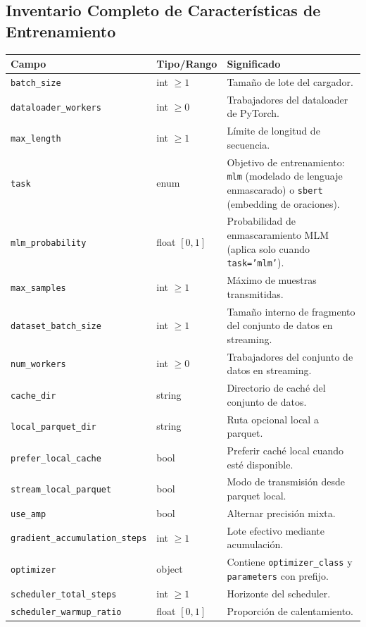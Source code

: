 \documentclass[11pt,a4paper]{article}
\begin{document}
\subsection{Inventario Completo de Características de Entrenamiento}

\small
\begin{longtable}{p{5.1cm}p{2.4cm}p{7.0cm}}
\toprule
\textbf{Campo} & \textbf{Tipo/Rango} & \textbf{Significado} \\
\midrule
\endhead
\texttt{batch\_size} & int $\ge 1$ & Tamaño de lote del cargador. \\
\texttt{dataloader\_workers} & int $\ge 0$ & Trabajadores del dataloader de PyTorch. \\
\texttt{max\_length} & int $\ge 1$ & Límite de longitud de secuencia. \\
\texttt{task} & enum & Objetivo de entrenamiento: \texttt{mlm} (modelado de lenguaje enmascarado) o \texttt{sbert} (embedding de oraciones). \\
\texttt{mlm\_probability} & float $[0,1]$ & Probabilidad de enmascaramiento MLM (aplica solo cuando \texttt{task='mlm'}). \\
\texttt{max\_samples} & int $\ge 1$ & Máximo de muestras transmitidas. \\
\texttt{dataset\_batch\_size} & int $\ge 1$ & Tamaño interno de fragmento del conjunto de datos en streaming. \\
\texttt{num\_workers} & int $\ge 0$ & Trabajadores del conjunto de datos en streaming. \\
\texttt{cache\_dir} & string & Directorio de caché del conjunto de datos. \\
\texttt{local\_parquet\_dir} & string & Ruta opcional local a parquet. \\
\texttt{prefer\_local\_cache} & bool & Preferir caché local cuando esté disponible. \\
\texttt{stream\_local\_parquet} & bool & Modo de transmisión desde parquet local. \\
\texttt{use\_amp} & bool & Alternar precisión mixta. \\
\texttt{gradient\_accumulation\_steps} & int $\ge 1$ & Lote efectivo mediante acumulación. \\
\texttt{optimizer} & object & Contiene \texttt{optimizer\_class} y \texttt{parameters} con prefijo. \\
\texttt{scheduler\_total\_steps} & int $\ge 1$ & Horizonte del scheduler. \\
\texttt{scheduler\_warmup\_ratio} & float $[0,1]$ & Proporción de calentamiento. \\

\end{longtable}
\end{document}
